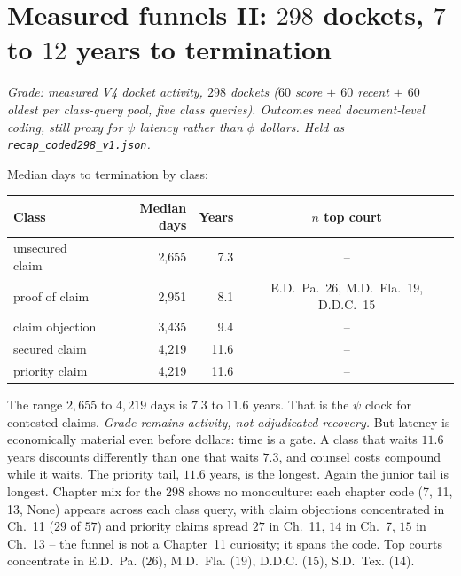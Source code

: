 \section{Measured funnels II: $298$ dockets, $7$ to $12$ years to termination}
\label{sec:recap-latency}

\textit{Grade: measured V4 docket activity, $298$ dockets ($60$ score $+$ $60$ recent $+$ $60$ oldest per class-query pool, five class queries). Outcomes need document-level coding, still proxy for $\psi$ latency rather than $\phi$ dollars. Held as \texttt{recap\_coded298\_v1.json}.}

Median days to termination by class:

\begin{center}
\small
\begin{tabular}{lrrc}
\toprule
Class & Median days & Years & $n$ top court \\
\midrule
unsecured claim & 2,655 & 7.3 & -- \\
proof of claim & 2,951 & 8.1 & E.D.~Pa.~26, M.D.~Fla.~19, D.D.C.~15 \\
claim objection & 3,435 & 9.4 & -- \\
secured claim & 4,219 & 11.6 & -- \\
priority claim & 4,219 & 11.6 & -- \\
\bottomrule
\end{tabular}
\end{center}

The range $2{,}655$ to $4{,}219$ days is $7.3$ to $11.6$ years. That is the $\psi$ clock for contested claims. \textit{Grade remains activity, not adjudicated recovery.} But latency is economically material even before dollars: time is a gate. A class that waits $11.6$ years discounts differently than one that waits $7.3$, and counsel costs compound while it waits. The priority tail, $11.6$ years, is the longest. Again the junior tail is longest. Chapter mix for the $298$ shows no monoculture: each chapter code (7, 11, 13, None) appears across each class query, with claim objections concentrated in Ch.~11 ($29$ of $57$) and priority claims spread $27$ in Ch.~11, $14$ in Ch.~7, $15$ in Ch.~13 -- the funnel is not a Chapter~11 curiosity; it spans the code. Top courts concentrate in E.D.~Pa. ($26$), M.D.~Fla. ($19$), D.D.C. ($15$), S.D.~Tex. ($14$).

